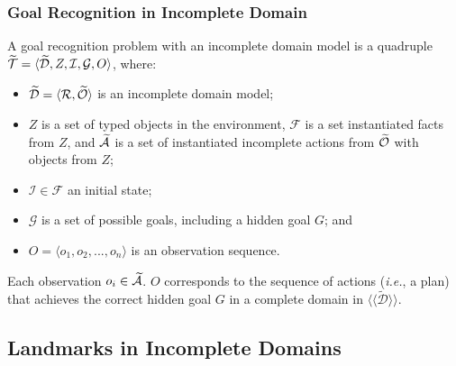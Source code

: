 \documentclass{beamer}
\newcommand{\idest}{{\it i.e.}}
\begin{document}
\begin{frame}[c]\frametitle{Goal Recognition in Incomplete Domain}
	\begin{definition}\label{def:GoalRecognitionIncompleteDomains}
	A goal recognition problem with an incomplete domain model is a quadruple $\widetilde{\mathcal{T}} = \langle \widetilde{\mathcal{D}}, Z, \mathcal{I}, \mathcal{G}, O \rangle$,
	where:
	\begin{itemize}
		\item $\widetilde{\mathcal{D}} = \langle \mathcal{R}, \widetilde{\mathcal{O}} \rangle$ is an incomplete domain model;
		\item $Z$ is a set of typed objects in the environment, $\mathcal{F}$ is a set instantiated facts from $Z$, and $\widetilde{\mathcal{\mathcal{A}}}$ is a set of instantiated incomplete actions from $\widetilde{\mathcal{O}}$ with objects from $Z$;
		\item $\mathcal{I} \in \mathcal{F}$ an initial state;
		\item $\mathcal{G}$ is a set of possible goals, including a hidden goal $G$; and
		\item $O = \langle o_1, o_2, ..., o_n\rangle$ is an observation sequence.
	\end{itemize}
	\end{definition}
	
	Each observation $o_i \in \widetilde{\mathcal{\mathcal{A}}}$. $O$ corresponds to the sequence of actions (\idest, a plan) that achieves the correct hidden goal $G$ in a complete domain in $\langle\langle \widetilde{\mathcal{D}} \rangle\rangle$.
\end{frame}



%


\subsection{Landmarks in Incomplete Domains}
\end{document}
